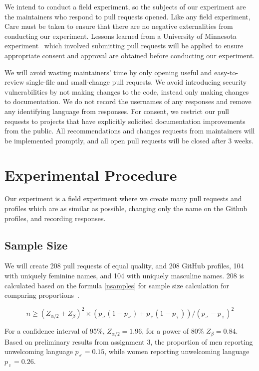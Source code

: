 \documentclass[journal,12pt,onecolumn,]{IEEEtran}
\begin{document}
We intend to conduct a field experiment, so the subjects of our experiment are the maintainers who respond to pull requests opened.
Like any field experiment, Care must be taken to ensure that there are no negative externalities from conducting our experiment.
Lessons learned from a University of Minnesota experiment~\cite{hypocritecommits} which involved submitting pull requests will be applied to ensure appropriate consent and approval are obtained before conducting our experiment.

We will avoid wasting maintainers' time by only opening useful and easy-to-review single-file and small-change pull requests.
We avoid introducing security vulnerabilities by not making changes to the code, instead only making changes to documentation.
We do not record the usernames of any responses and remove any identifying language from responses.
For consent, we restrict our pull requests to projects that have explicitly solicited documentation improvements from the public.
All recommendations and changes requests from maintainers will be implemented promptly, and all open pull requests will be closed after 3 weeks.

\section{Experimental Procedure}

Our experiment is a field experiment where we create many pull requests and profiles which are as similar as possible, changing only the name on the Github profiles, and recording responses.

\subsection{Sample Size}

We will create 208 pull requests of equal quality, and 208 GitHub profiles, 104 with uniquely feminine names, and 104 with uniquely masculine names.
208 is calculated based on the formula \ref{nsamples} for sample size calculation for comparing proportions~\cite{wang2007sample}.

\begin{equation} \label{nsamples}
    n \ge ( Z_{\alpha/2} + Z_{\beta} )^2 \times ( p_{\male} ( 1 - p_{\male} ) + p_{\female} ( 1 - p_{\female})) / ( p_{\male} - p_{\female})^2
\end{equation}

For a confidence interval of 95\%, $Z_{\alpha/2} = 1.96$, for a power of 80\% $Z_{\beta} = 0.84$.
Based on preliminary results from assignment 3, the proportion of men reporting unwelcoming language $p_{\male} = 0.15$,
while women reporting unwelcoming language $p_{\female} = 0.26$.
\end{document}
